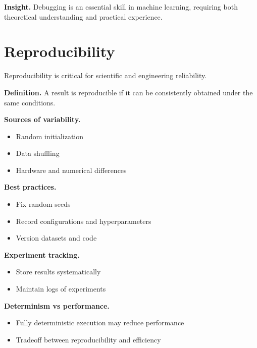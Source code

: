 \medskip

\noindent
\textbf{Insight.}  
Debugging is an essential skill in machine learning, requiring both theoretical understanding and practical experience.

\section{Reproducibility}

Reproducibility is critical for scientific and engineering reliability.

\medskip

\noindent
\textbf{Definition.}  
A result is reproducible if it can be consistently obtained under the same conditions.

\medskip

\noindent
\textbf{Sources of variability.}
\begin{itemize}
    \item Random initialization
    \item Data shuffling
    \item Hardware and numerical differences
\end{itemize}

\medskip

\noindent
\textbf{Best practices.}
\begin{itemize}
    \item Fix random seeds
    \item Record configurations and hyperparameters
    \item Version datasets and code
\end{itemize}

\medskip

\noindent
\textbf{Experiment tracking.}
\begin{itemize}
    \item Store results systematically
    \item Maintain logs of experiments
\end{itemize}

\medskip

\noindent
\textbf{Determinism vs performance.}
\begin{itemize}
    \item Fully deterministic execution may reduce performance
    \item Tradeoff between reproducibility and efficiency
\end{itemize}

\medskip


